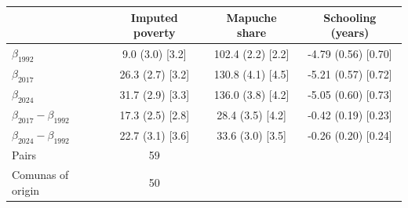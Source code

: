 \begin{tabular}{lccc}
\toprule
 & Imputed poverty & Mapuche share & Schooling (years) \\
\midrule
$\beta_{1992}$ & 9.0 (3.0) [3.2] & 102.4 (2.2) [2.2] & -4.79 (0.56) [0.70] \\
$\beta_{2017}$ & 26.3 (2.7) [3.2] & 130.8 (4.1) [4.5] & -5.21 (0.57) [0.72] \\
$\beta_{2024}$ & 31.7 (2.9) [3.3] & 136.0 (3.8) [4.2] & -5.05 (0.60) [0.73] \\
\midrule
$\beta_{2017}-\beta_{1992}$ & 17.3 (2.5) [2.8] & 28.4 (3.5) [4.2] & -0.42 (0.19) [0.23] \\
$\beta_{2024}-\beta_{1992}$ & 22.7 (3.1) [3.6] & 33.6 (3.0) [3.5] & -0.26 (0.20) [0.24] \\
\midrule
Pairs & 59 & & \\
Comunas of origin & 50 & & \\
\bottomrule
\end{tabular}
